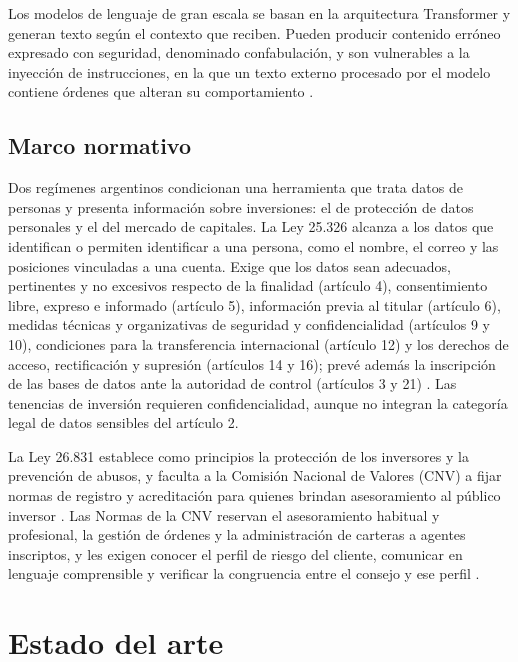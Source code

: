 Los modelos de lenguaje de gran escala se basan en la arquitectura Transformer \parencite{Vaswani2017} y generan texto según el contexto que reciben. Pueden producir contenido erróneo expresado con seguridad, denominado confabulación, y son vulnerables a la inyección de instrucciones, en la que un texto externo procesado por el modelo contiene órdenes que alteran su comportamiento \parencite{NIST2024genai,Greshake2023indirect}.

\subsection{Marco normativo}\label{subsec:marco-normativo}

Dos regímenes argentinos condicionan una herramienta que trata datos de personas y presenta información sobre inversiones: el de protección de datos personales y el del mercado de capitales. La Ley 25.326 alcanza a los datos que identifican o permiten identificar a una persona, como el nombre, el correo y las posiciones vinculadas a una cuenta. Exige que los datos sean adecuados, pertinentes y no excesivos respecto de la finalidad (artículo 4), consentimiento libre, expreso e informado (artículo 5), información previa al titular (artículo 6), medidas técnicas y organizativas de seguridad y confidencialidad (artículos 9 y 10), condiciones para la transferencia internacional (artículo 12) y los derechos de acceso, rectificación y supresión (artículos 14 y 16); prevé además la inscripción de las bases de datos ante la autoridad de control (artículos 3 y 21) \parencite{Ley25326}. Las tenencias de inversión requieren confidencialidad, aunque no integran la categoría legal de datos sensibles del artículo 2.

La Ley 26.831 establece como principios la protección de los inversores y la prevención de abusos, y faculta a la Comisión Nacional de Valores (CNV) a fijar normas de registro y acreditación para quienes brindan asesoramiento al público inversor \parencite{Ley26831}. Las Normas de la CNV reservan el asesoramiento habitual y profesional, la gestión de órdenes y la administración de carteras a agentes inscriptos, y les exigen conocer el perfil de riesgo del cliente, comunicar en lenguaje comprensible y verificar la congruencia entre el consejo y ese perfil \parencite{CNV2018rg731}.

\section{Estado del arte}\label{sec:estado-del-arte}

